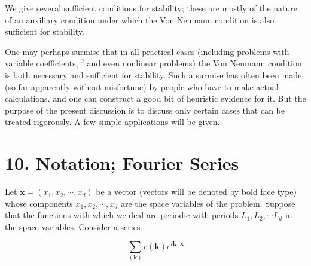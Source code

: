 \documentclass[10pt]{article}
\begin{document}
We give several sufficient conditions for stability; these are mostly of the nature of an auxiliary condition under which the Von Neumann condition is also sufficient for stability.

One may perhaps surmise that in all practical cases (including problems with variable coefficients, \({ }^{2}\) and even nonlinear problems) the Von Neumann condition is both necessary and sufficient for stability. Such a surmise has often been made (so far apparently without misfortune) by people who have to make actual calculations, and one can construct a good bit of heuristic evidence for it. But the purpose of the present discussion is to discuss only certain cases that can be treated rigorously. A few simple applications will be given.

\section*{10. Notation; Fourier Series}
Let \(\mathbf{x}=\left(x_{1}, x_{2}, \cdots, x_{d}\right)\) be a vector (vectors will be denoted by bold face type) whose components \(x_{1}, x_{2}, \cdots, x_{d}\) are the space variables of the problem. Suppose that the functions with which we deal are periodic with periods \(L_{1}, L_{2}, \cdots L_{d}\) in the space variables. Consider a series

\[
\sum_{(\mathbf{k})} c(\mathbf{k}) e^{i \mathbf{k} \cdot \mathbf{x}}
\]
\end{document}
